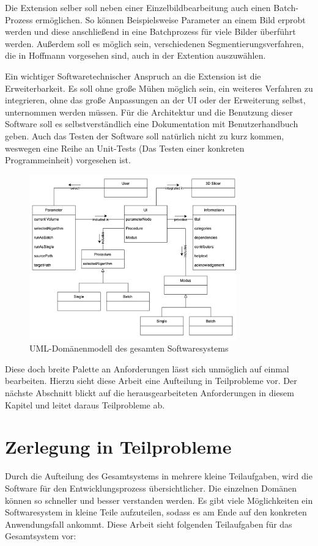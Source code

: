 Die Extension selber soll neben einer Einzelbildbearbeitung auch einen Batch-Prozess
ermöglichen. So können Beispielsweise Parameter an einem Bild erprobt werden und
diese anschließend in eine Batchprozess für viele Bilder überführt werden. Außerdem
soll es möglich sein, verschiedenen Segmentierungsverfahren, die in Hoffmann vorgesehen
sind, auch in der Extention auszuwählen.

Ein wichtiger Softwaretechnischer Anspruch an die Extension ist die
Erweiterbarkeit. Es soll ohne große Mühen möglich sein, ein weiteres Verfahren
zu integrieren, ohne das große Anpassungen an der UI oder der Erweiterung selbst,
unternommen werden müssen. Für die Architektur und die Benutzung dieser Software
soll es selbstverständlich eine Dokumentation mit Benutzerhandbuch geben. Auch
das Testen der Software soll natürlich nicht zu kurz kommen, weswegen eine Reihe
an Unit-Tests (Das Testen einer konkreten Programmeinheit) vorgesehen ist.

\begin{figure}[h]
	\centering
	\includegraphics[width=0.8\textwidth]{img/domaenenmodell.jpg}
	\caption{UML-Domänenmodell des gesamten Softwaresystems}
	\label{fig:3d_slicer_domäne}
\end{figure}

Diese doch breite Palette an Anforderungen lässt sich unmöglich auf einmal bearbeiten.
Hierzu sieht diese Arbeit eine Aufteilung in Teilprobleme vor. Der nächste Abschnitt
blickt auf die herausgearbeiteten Anforderungen in diesem Kapitel und leitet daraus
Teilprobleme ab.

\section{Zerlegung in Teilprobleme}
\label{sec_zerlegung_in_teilprobleme} Durch die Aufteilung des Gesamtsystems in mehrere
kleine Teilaufgaben, wird die Software für den Entwicklungsprozess
übersichtlicher. Die einzelnen Domänen können so schneller und besser verstanden
werden. Es gibt viele Möglichkeiten ein Softwaresystem in kleine Teile
aufzuteilen, sodass es am Ende auf den konkreten Anwendungsfall ankommt. Diese
Arbeit sieht folgenden Teilaufgaben für das Gesamtsystem vor:

